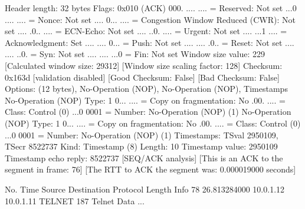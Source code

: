     Header length: 32 bytes
    Flags: 0x010 (ACK)
        000. .... .... = Reserved: Not set
        ...0 .... .... = Nonce: Not set
        .... 0... .... = Congestion Window Reduced (CWR): Not set
        .... .0.. .... = ECN-Echo: Not set
        .... ..0. .... = Urgent: Not set
        .... ...1 .... = Acknowledgment: Set
        .... .... 0... = Push: Not set
        .... .... .0.. = Reset: Not set
        .... .... ..0. = Syn: Not set
        .... .... ...0 = Fin: Not set
    Window size value: 229
    [Calculated window size: 29312]
    [Window size scaling factor: 128]
    Checksum: 0x163d [validation disabled]
        [Good Checksum: False]
        [Bad Checksum: False]
    Options: (12 bytes), No-Operation (NOP), No-Operation (NOP), Timestamps
        No-Operation (NOP)
            Type: 1
                0... .... = Copy on fragmentation: No
                .00. .... = Class: Control (0)
                ...0 0001 = Number: No-Operation (NOP) (1)
        No-Operation (NOP)
            Type: 1
                0... .... = Copy on fragmentation: No
                .00. .... = Class: Control (0)
                ...0 0001 = Number: No-Operation (NOP) (1)
        Timestamps: TSval 2950109, TSecr 8522737
            Kind: Timestamp (8)
            Length: 10
            Timestamp value: 2950109
            Timestamp echo reply: 8522737
    [SEQ/ACK analysis]
        [This is an ACK to the segment in frame: 76]
        [The RTT to ACK the segment was: 0.000019000 seconds]

No.     Time           Source                Destination           Protocol Length Info
     78 26.813284000   10.0.1.12             10.0.1.11             TELNET   187    Telnet Data ...

